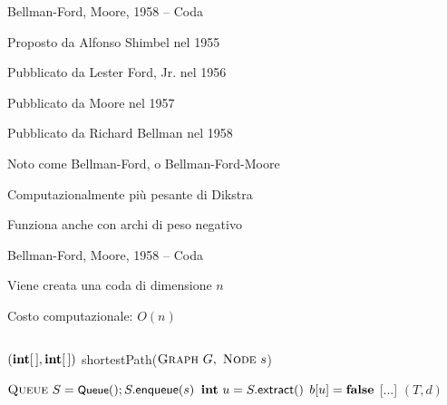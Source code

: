 \begin{frame}{Bellman-Ford, Moore, 1958 -- Coda}

\vspace{-9pt}
\begin{myboxtitle}[Storia]
\BI
\item Proposto da Alfonso Shimbel nel 1955
\item Pubblicato da Lester Ford, Jr. nel 1956
\item Pubblicato da Moore nel 1957
\item Pubblicato da Richard Bellman nel 1958
\item Noto come Bellman-Ford, o Bellman-Ford-Moore
\EI
\end{myboxtitle}

\begin{myboxtitle}[Note]
\BI
\item Computazionalmente più pesante di Dikstra
\item Funziona anche con archi di peso negativo
\EI
\end{myboxtitle}

\end{frame}


\begin{frame}{Bellman-Ford, Moore, 1958 -- Coda}

\vspace{-9pt}
\begin{myboxtitle}
\BI
\item Viene creata una coda di dimensione $n$
\item Costo computazionale: $O(n)$
\EI
\end{myboxtitle}

\vspace{-18pt}
\begin{columns}
\small
\begin{Procedure}
\caption[A]{$(\INTARRAY, \INTARRAY)$ \textsf{shortestPath}($\textsc{Graph}\ G,\ \textsc{Node}\ s$)}
\alert{$\textsc{Queue}\ S = \textsf{{\small Queue}}(); S.\textsf{enqueue}(s)$}\;
{
  $\INTEGER\ u = S.\textsf{extract}()$\;
  $b[u] = \FALSE$\;
  {
    {
      [...]
    }
  }
}
\Return $(T,d)$
\end{Procedure}
\end{columns}

\end{frame}


